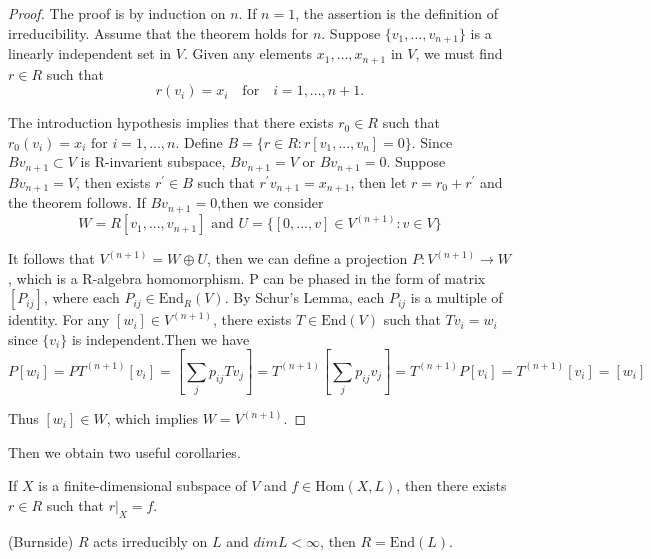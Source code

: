 \documentclass[12pt]{article}
\newenvironment{corollary}[2][Corollary]{\begin{trivlist}
\item[\hskip \labelsep {\bfseries #1}\hskip \labelsep {\bfseries #2.}]}{\end{trivlist}}
\begin{document}
\begin{proof}
    The proof is by induction on $n$. If $n = 1$, the assertion is the definition of irreducibility. Assume that the theorem holds for $n$. Suppose $\{v_1, \ldots, v_{n+1}\}$ is a linearly independent set in $V$.
Given any elements $x_1, \ldots, x_{n+1}$ in $V$, we must find $r \in R$ such that
\[ r(v_i) = x_i \quad \text{for} \quad i = 1, \ldots, n+1. \]

The introduction hypothesis implies that there exists $r_0 \in R$ such that $r_0(v_i) = x_i \text{ for } i=1,...,n $. Define $B = \{r\in R:r[v_1,...,v_n] = 0\}$. Since $Bv_{n+1}\subset V$ is R-invarient subspace, $Bv_{n+1} = V$ or $Bv_{n+1} = 0$. Suppose $Bv_{n+1} = V$, then exists $r^{'} \in B$ such that $r^{'}v_{n+1} = x_{n+1}$, then let $r = r_0+r^{'}$ and the theorem follows. If $Bv_{n+1} = 0$,then we consider$$W=R[v_1,...,v_{n+1}]\text{ and }U=\{[0,...,v]\in V^{(n+1)}:v\in V\}$$

It follows that $V^{(n+1)}=W\oplus U$, then we can define a projection $P:V^{(n+1)}\to W$, which is a R-algebra homomorphism. P can be phased in the form of matrix $[P_{ij}]$, where each $P_{ij}\in \mathrm{End}_R(V)$. By Schur's Lemma, each $P_{ij}$ is a multiple of identity. For any $[w_i]\in V^{(n+1)}$, there exists $T\in \mathrm{End}(V)$ such that $Tv_i=w_i$ since $\{v_i\}$ is independent.Then we have
$$P[w_i]= PT^{(n+1)}[v_i]=[\sum_j p_{ij}Tv_j]=T^{(n+1)}[\sum_j p_{ij}v_j]=T^{(n+1)}P[v_i]=T^{(n+1)}[v_i]=[w_i]$$

Thus $[w_i]\in W$, which implies $W = V^{(n+1)}$.
\end{proof}
\vspace{1cm}
Then we obtain two useful corollaries.
\begin{corollary}{4.2}
    If $X$ is a finite-dimensional subspace of $V$ and $f\in \mathrm{Hom}(X,L)$, then there exists $r\in R$ such that $r\vert_{X} = f$.
\end{corollary}
\begin{corollary}{4.3}
    (Burnside) $R$ acts irreducibly on $L$ and $dimL<\infty$, then $R=\mathrm{End}(L)$.
\end{corollary}
\end{document}
